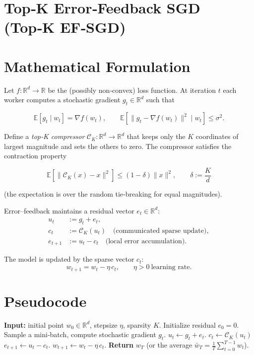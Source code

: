\documentclass{article}
\newcommand{\E}{\mathbb{E}}
\newcommand{\R}{\mathbb{R}}
\begin{document}
\section*{Top‑K Error‑Feedback SGD (Top‑K EF‑SGD)}

\section*{Mathematical Formulation}
Let $f:\R^{d}\rightarrow\R$ be the (possibly non‑convex) loss function.  
At iteration $t$ each worker computes a stochastic gradient $g_{t}\in\R^{d}$ such that  

\[
\E\!\left[g_{t}\mid w_{t}\right]=\nabla f(w_{t}),\qquad
\E\!\left[\|g_{t}-\nabla f(w_{t})\|^{2}\mid w_{t}\right]\le\sigma^{2}.
\]

Define a \emph{top‑K compressor} $\mathcal C_{K}:\R^{d}\rightarrow\R^{d}$ that keeps only the $K$ coordinates of largest magnitude and sets the others to zero.  The compressor satisfies the contraction property  

\[
\boxed{\;\E\!\left[\|\mathcal C_{K}(x)-x\|^{2}\right]\le (1-\delta)\|x\|^{2},\qquad 
\delta:=\frac{K}{d}\;}
\tag{1}
\]

(the expectation is over the random tie‑breaking for equal magnitudes).

Error–feedback maintains a residual vector $e_{t}\in\R^{d}$:
\[
\begin{aligned}
u_{t} &:= g_{t}+e_{t},\\
c_{t} &:= \mathcal C_{K}(u_{t})\quad\text{(communicated sparse update)},\\
e_{t+1}&:= u_{t}-c_{t}\quad\text{(local error accumulation)}.
\end{aligned}
\tag{2}
\]

The model is updated by the sparse vector $c_{t}$:
\[
\boxed{w_{t+1}=w_{t}-\eta\,c_{t}},\qquad \eta>0\ \text{learning rate}.
\tag{3}
\]

\section*{Pseudocode}
\begin{algorithm}[H]
\caption{Top‑K EF‑SGD}
\begin{algorithmic}[1]
\State \textbf{Input:} initial point $w_{0}\in\R^{d}$, stepsize $\eta$, sparsity $K$.
\State Initialize residual $e_{0}=0$.
    \State Sample a mini‑batch, compute stochastic gradient $g_{t}$.
    \State $u_{t}\gets g_{t}+e_{t}$.
    \State $c_{t}\gets \mathcal C_{K}(u_{t})$ 
    \State $e_{t+1}\gets u_{t}-c_{t}$.
    \State $w_{t+1}\gets w_{t}-\eta\,c_{t}$.
\EndFor
\State \textbf{Return} $w_{T}$ (or the average $\bar w_{T}=\frac1T\sum_{t=0}^{T-1}w_{t}$).
\end{algorithmic}
\end{algorithm}
\end{document}
